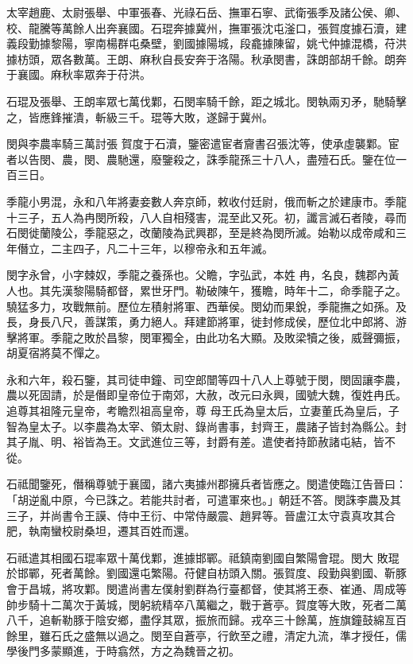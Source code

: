 \begin{pinyinscope}
 太宰趙鹿、太尉張舉、中軍張春、光祿石岳、撫軍石寧、武衛張季及諸公侯、卿、校、龍騰等萬餘人出奔襄國。石琨奔據冀州，撫軍張沈屯滏口，張賀度據石瀆，建義段勤據黎陽，寧南楊群屯桑壁，劉國據陽城，段龕據陳留，姚弋仲據混橋，苻洪據枋頭，眾各數萬。王朗、麻秋自長安奔于洛陽。秋承閔書，誅朗部胡千餘。朗奔于襄國。麻秋率眾奔于苻洪。



 石琨及張舉、王朗率眾七萬伐鄴，石閔率騎千餘，距之城北。閔執兩刃矛，馳騎擊之，皆應鋒摧潰，斬級三千。琨等大敗，遂歸于冀州。



 閔與李農率騎三萬討張
 賀度于石瀆，鑒密遣宦者齎書召張沈等，使承虛襲鄴。宦者以告閔、農，閔、農馳還，廢鑒殺之，誅季龍孫三十八人，盡殪石氏。鑒在位一百三日。



 季龍小男混，永和八年將妻妾數人奔京師，敕收付廷尉，俄而斬之於建康市。季龍十三子，五人為冉閔所殺，八人自相殘害，混至此又死。初，讖言滅石者陵，尋而石閔徙蘭陵公，季龍惡之，改蘭陵為武興郡，至是終為閔所滅。始勒以成帝咸和三年僭立，二主四子，凡二十三年，以穆帝永和五年滅。



 閔字永曾，小字棘奴，季龍之養孫也。父瞻，字弘武，本姓
 冉，名良，魏郡內黃人也。其先漢黎陽騎都督，累世牙門。勒破陳午，獲瞻，時年十二，命季龍子之。驍猛多力，攻戰無前。歷位左積射將軍、西華侯。閔幼而果銳，季龍撫之如孫。及長，身長八尺，善謀策，勇力絕人。拜建節將軍，徙封修成侯，歷位北中郎將、游擊將軍。季龍之敗於昌黎，閔軍獨全，由此功名大顯。及敗梁犢之後，威聲彌振，胡夏宿將莫不憚之。



 永和六年，殺石鑒，其司徒申鐘、司空郎闓等四十八人上尊號于閔，閔固讓李農，農以死固請，於是僭即皇帝位于南郊，大赦，改元曰永興，國號大魏，復姓冉氏。追尊其祖隆元皇帝，考瞻烈祖高皇帝，尊
 母王氏為皇太后，立妻董氏為皇后，子智為皇太子。以李農為太宰、領太尉、錄尚書事，封齊王，農諸子皆封為縣公。封其子胤、明、裕皆為王。文武進位三等，封爵有差。遣使者持節赦諸屯結，皆不從。



 石祗聞鑒死，僭稱尊號于襄國，諸六夷據州郡擁兵者皆應之。閔遣使臨江告晉曰：「胡逆亂中原，今已誅之。若能共討者，可遣軍來也。」朝廷不答。閔誅李農及其三子，并尚書令王謨、侍中王衍、中常侍嚴震、趙昇等。晉盧江太守袁真攻其合肥，執南蠻校尉桑坦，遷其百姓而還。



 石祗遣其相國石琨率眾十萬伐鄴，進據邯鄲。祗鎮南劉國自繁陽會琨。閔大
 敗琨於邯鄲，死者萬餘。劉國還屯繁陽。苻健自枋頭入關。張賀度、段勤與劉國、靳豚會于昌城，將攻鄴。閔遣尚書左僕射劉群為行臺都督，使其將王泰、崔通、周成等帥步騎十二萬次于黃城，閔躬統精卒八萬繼之，戰于蒼亭。賀度等大敗，死者二萬八千，追斬勒豚于陰安鄉，盡俘其眾，振旅而歸。戎卒三十餘萬，旌旗鐘鼓綿亙百餘里，雖石氏之盛無以過之。閔至自蒼亭，行飲至之禮，清定九流，準才授任，儒學後門多蒙顯進，于時翕然，方之為魏晉之初。




\end{pinyinscope}
